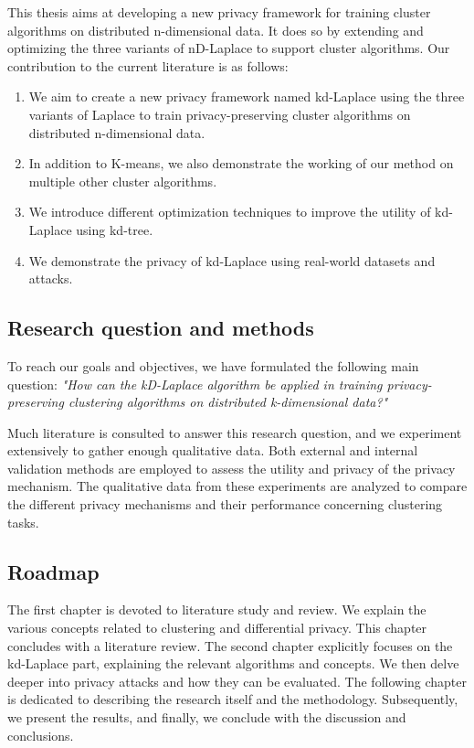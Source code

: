 This thesis aims at developing a new privacy framework for training cluster algorithms on distributed n-dimensional data.
It does so by extending and optimizing the three variants of nD-Laplace to support cluster algorithms.
Our contribution to the current literature is as follows:
\begin{enumerate}
  \item We aim to create a new privacy framework named kd-Laplace using the three variants of Laplace to train privacy-preserving cluster algorithms on distributed n-dimensional data.
  \item In addition to K-means, we also demonstrate the working of our method on multiple other cluster algorithms.
  \item We introduce different optimization techniques to improve the utility of kd-Laplace using kd-tree.
  \item We demonstrate the privacy of kd-Laplace using real-world datasets and attacks.
\end{enumerate}

\subsection*{Research question and methods}
To reach our goals and objectives, we have formulated the following main question: \newline \newline
\textit{"How can the kD-Laplace algorithm be applied in training privacy-preserving clustering algorithms on distributed k-dimensional data?"} \newline

Much literature is consulted to answer this research question, and we experiment extensively to gather enough qualitative data.
Both external and internal validation methods are employed to assess the utility and privacy of the privacy mechanism.
The qualitative data from these experiments are analyzed to compare the different privacy mechanisms and their performance concerning clustering tasks.

\subsection*{Roadmap}
The first chapter is devoted to literature study and review.
We explain the various concepts related to clustering and differential privacy.
This chapter concludes with a literature review.
The second chapter explicitly focuses on the kd-Laplace part, explaining the relevant algorithms and concepts.
We then delve deeper into privacy attacks and how they can be evaluated. \newline
The following chapter is dedicated to describing the research itself and the methodology.
Subsequently, we present the results, and finally, we conclude with the discussion and conclusions.



